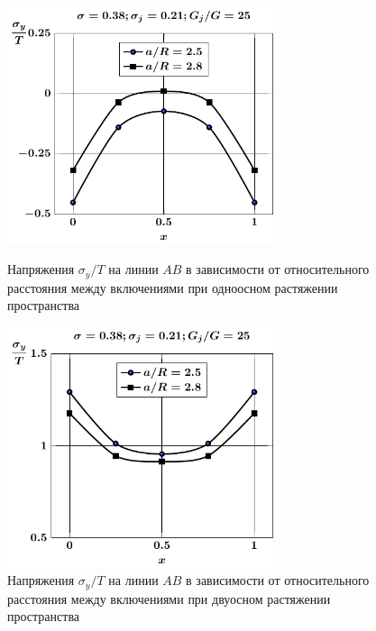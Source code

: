 \begin{russian}
\begin{figure}[h!]
\centering\footnotesize
\parbox[b]{7.5cm}{\centering\includegraphics[width=7.8cm]{inc9-a-d95-g25-t1-sig_y.pdf}
\caption{Напряжения $\sigma_y/T$ на линии  $AB$ в зависимости от относительного расстояния между включениями при одноосном растяжении пространства
\label{f:8:66}}}\hfil\hfil
\parbox[b]{7.5cm}{\centering\includegraphics[width=7.8cm]{inc9-a-d95-g25-t2-sig_y.pdf}
\caption{Напряжения $\sigma_y/T$ на линии  $AB$ в зависимости от относительного расстояния между включениями при двуосном растяжении пространства
\label{f:8:67}}}
\end{figure}


\end{russian}
